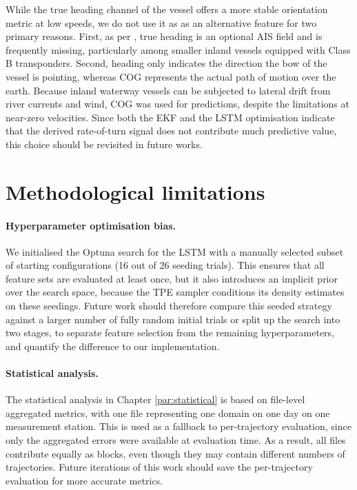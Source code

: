 While the true heading channel of the vessel offers a more stable orientation metric at low speeds, we do not use it as as an alternative feature for two primary reasons. First, as per \textcite{itu-r-m1371-1-2001}, true heading is an optional AIS field and is frequently missing, particularly among smaller inland vessels equipped with Class B transponders. Second, heading only indicates the direction the bow of the vessel is pointing, whereas \ac{COG} represents the actual path of motion over the earth. Because inland waterway vessels can be subjected to lateral drift from river currents and wind, \ac{COG} was used for predictions, despite the %
limitations at near-zero velocities. %
Since both the EKF and the LSTM optimisation indicate that the derived rate-of-turn signal does not contribute much predictive value, this choice should be revisited in future works.










\section{Methodological limitations}


\paragraph{Hyperparameter optimisation bias.}
We initialised the Optuna search for the \ac{LSTM} with a manually selected subset of starting configurations (16 out of 26 seeding trials). This ensures that all feature sets are evaluated at least once, but it also introduces an implicit prior over the search space, because the \ac{TPE} sampler conditions its density estimates on these seedings. Future work should therefore compare this seeded strategy against a larger number of fully random initial trials or split up the search into two stages, to separate feature selection from the remaining hyperparameters, and quantify the difference to our implementation.


\paragraph{Statistical analysis.}
The statistical analysis in Chapter \ref{par:statistical} is based on file-level aggregated metrics, with one file representing one domain on one day on one measurement station. This is used as a fallback to per-trajectory evaluation, since only the aggregated errors were available at evaluation time. As a result, all files contribute equally as blocks, even though they may contain different numbers of trajectories. %
Future iterations of this work should save the per-trajectory evaluation for more accurate metrics.


